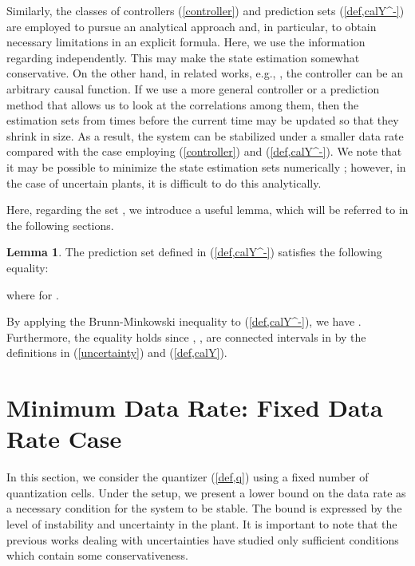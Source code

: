 \documentclass[a4paper, 11pt]{article}
\makeatletter
\theoremstyle{definition}
\newtheorem{lem}{Lemma}
\newenvironment{pf}[1][\proofname]{\par\pushQED{\qed}
 \normalfont\topsep6\p@\@plus6\p@\relax\trivlist\item[\hskip\labelsep\bfseries#1\@addpunct{.}]
 \ignorespaces}{\popQED\endtrivlist\@endpefalse}
\makeatother
\begin{document}
Similarly, the classes of controllers (\ref{controller}) and prediction sets
(\ref{def,calY^-}) are employed to pursue an analytical approach and,
in particular, to obtain necessary limitations in an explicit formula.
Here, we use the information regarding  independently.
This may make the state estimation somewhat conservative.
On the other hand, in related works, e.g., \cite{Tatikonda2004, Nair2004, You2010},
the controller can be an arbitrary causal function.
If we use a more general controller or a prediction method that allows us to
look at the correlations among them, then the estimation sets
 from times before the current time 
may be updated so that they shrink in size.
As a result, the system can be stabilized under a smaller data rate compared
with the case employing (\ref{controller}) and (\ref{def,calY^-}).
We note that it may be possible to minimize the state estimation sets numerically \cite{Rohn1989};
however, in the case of uncertain plants, it is difficult to do this analytically.

Here, regarding the set , we introduce a useful lemma,
which will be referred to in the following sections.
\begin{lem}\label{lem,BM}
 The prediction set  defined in (\ref{def,calY^-})
satisfies the following equality:
 
where 
for .
\end{lem}

\begin{pf}
 \begin{sloppypar}
 By applying the Brunn-Minkowski inequality \cite{Cover2006} to (\ref{def,calY^-}),
 we have .
 Furthermore, the equality holds since , ,
 are connected intervals in  by the definitions in (\ref{uncertainty})
 and (\ref{def,calY}).
 \end{sloppypar}
\end{pf}


\section{Minimum Data Rate: Fixed Data Rate Case}\label{sec,nec}
In this section, we consider the quantizer (\ref{def,q}) using a fixed number
 of quantization cells.
Under the setup, we present a lower bound on the data rate 
as a necessary condition for the system to be stable.
The bound is expressed by the level of instability and uncertainty in the plant.
It is important to note that the previous works \cite{Phat2004, Martins2006, Fu2010}
dealing with uncertainties have studied only sufficient conditions
which contain some conservativeness.
\end{document}
